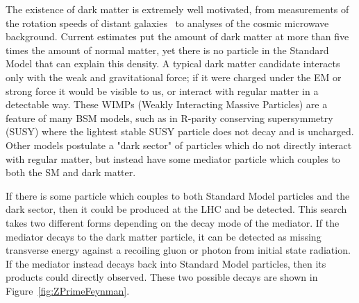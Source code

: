 The existence of dark matter is extremely well motivated, from measurements of the rotation speeds of distant galaxies~\cite{DMGalaxy} to analyses of the cosmic microwave background.\cite{DMCMB}  Current estimates put the amount of dark matter at more than five times the amount of normal matter, yet there is no particle in the Standard Model that can explain this density.  A typical dark matter candidate interacts only with the weak and gravitational force; if it were charged under the EM or strong force it would be visible to us, or interact with regular matter in a detectable way.  These WIMPs (Weakly Interacting Massive Particles) are a feature of many BSM models, such as in R-parity conserving supersymmetry (SUSY) where the lightest stable SUSY particle does not decay and is uncharged.  Other models postulate a "dark sector" of particles which do not directly interact with regular matter, but instead have some mediator particle which couples to both the SM and dark matter.

If there is some particle which couples to both Standard Model particles and the dark sector, then it could be produced at the LHC and be detected.  This search takes two different forms depending on the decay mode of the mediator.  If the mediator decays to the dark matter particle, it can be detected as missing transverse energy against a recoiling gluon or photon from initial state radiation.  If the mediator instead decays back into Standard Model particles, then its products could directly observed.  These two possible decays are shown in Figure~\ref{fig:ZPrimeFeynman}.


